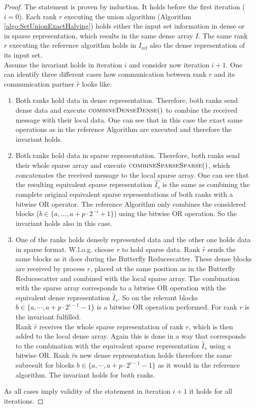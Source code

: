 \begin{proof}
	The statement is proven by induction. It holds before the first iteration ($i=0$). Each rank $r$ executing the union algorithm (Algorithm \ref{algo:SetUnionExactHalving}) holds either the input set information in dense or in sparse representation, which results in the same dense array $I$. The same rank $r$ executing the reference algorithm holds in $I_\mathrm{ref}$ also the dense representation of its input set.\\
	Assume the invariant holds in iteration $i$ and consider now iteration $i+1$. One can identify three different cases how communication between rank $r$ and its communication partner $\hat{r}$ looks like: 
	\begin{enumerate}
		\item Both ranks hold data in dense representation. Therefore, both ranks send dense data and execute $\Call{combineDenseDense}$ to combine the received message with their local data. One can see that in this case the exact same operations as in the reference Algorithm are executed and therefore the invariant holds.
		
		\item Both ranks hold data in sparse representation. Therefore, both ranks send their whole sparse array and execute $\Call{combineSparseSparse}$, which concatenates the received message to the local sparse array. One can see that the resulting equivalent sparse representation $\hat{I_s}$ is the same as combining the complete original equivalent sparse representations of both ranks with a bitwise OR operator. The reference Algorithm only combines the considered blocks ($b\in\{a, \dots, a+p\cdot2^{-i}+1\}$) using the bitwise OR operation. So the invariant holds also in this case.
		
		\item One of the ranks holds densely represented data and the other one holds data in sparse format. W.l.o.g. choose $r$ to hold sparse data. Rank $\hat{r}$ sends the same blocks as it does during the Butterfly Reducescatter. These dense blocks are received by process $r$, placed at the same position as in the Butterfly Reducescatter and combined with the local sparse array. The combination with the sparse array corresponds to a bitwise OR operation with the equivalent dense representation $\hat{I}_s$. So on the relevant blocks $b\in \{a, \cdots, a+p\cdot 2^{i-1}-1\}$ is a bitwise OR operation performed. For rank $r$ is the invariant fulfilled. \\
		Rank $\hat{r}$ receives the whole sparse representation of rank $r$, which is then added to the local dense array. Again this is done in a way that corresponds to the combination with the equivalent sparse representation $\hat{I}_s$ using a bitwise OR. Rank $\hat{r}$s new dense representation holds therefore the same  subresult for blocks $b\in \{a, \cdots, a+p\cdot 2^{i-1}-1\}$ as it would in the reference algorithm. The invariant holds for both ranks.
	\end{enumerate}
	As all cases imply validity of the statement in iteration $i+1$ it holds for all iterations.
\end{proof}
